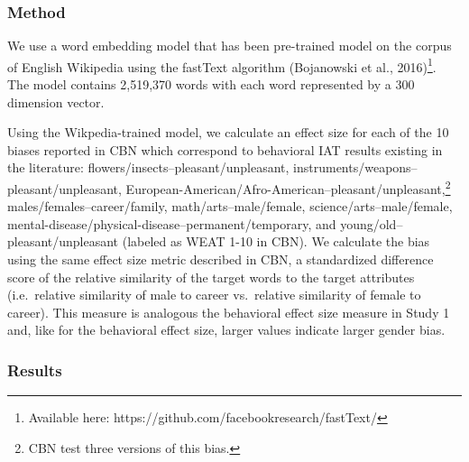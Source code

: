 \documentclass[10pt, letterpaper]{article}
\begin{document}
\subsubsection{Method}\label{method-1}

We use a word embedding model that has been pre-trained model on the
corpus of English Wikipedia using the fastText algorithm (Bojanowski et
al.,
2016)\footnote{Available here: https://github.com/facebookresearch/fastText/}.
The model contains 2,519,370 words with each word represented by a 300
dimension vector.

Using the Wikpedia-trained model, we calculate an effect size for each
of the 10 biases reported in CBN which correspond to behavioral IAT
results existing in the literature:
flowers/insects--pleasant/unpleasant,
instruments/weapons--pleasant/unpleasant,
European-American/Afro-American--pleasant/unpleasant,\footnote{CBN test three versions of this bias.}
males/females--career/family, math/arts--male/female,
science/arts--male/female,
mental-disease/physical-disease--permanent/temporary, and
young/old--pleasant/unpleasant (labeled as WEAT 1-10 in CBN). We
calculate the bias using the same effect size metric described in CBN, a
standardized difference score of the relative similarity of the target
words to the target attributes (i.e.~relative similarity of male to
career vs.~relative similarity of female to career). This measure is
analogous the behavioral effect size measure in Study 1 and, like for
the behavioral effect size, larger values indicate larger gender bias.

\subsubsection{Results}\label{results-1}
\end{document}
